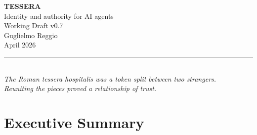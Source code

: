 \documentclass[11pt, a4paper]{article}
\begin{document}
\thispagestyle{empty}
\vspace*{3.5cm}

\begin{center}
  {\Huge\bfseries TESSERA}\\[0.8em]
  {\Large Identity and authority for AI agents}\\[2.5em]
  {\large Working Draft v0.7}\\[1.2em]
  {\large Guglielmo Reggio}\\[0.6em]
  {\normalsize April 2026}\\[4em]
  \rule{8cm}{0.4pt}\\[1.5em]
  {\itshape\small
    The Roman \emph{tessera hospitalis} was a token split between two strangers.\\
    Reuniting the pieces proved a relationship of trust.
  }
\end{center}

\newpage
\setcounter{page}{1}
\tableofcontents
\newpage

\begin{abstract}
\noindent AI agents can now execute shell commands, modify files, send messages, call APIs, and trigger real-world side effects. The main security problem is no longer model output quality alone. It is ambient authority: agents routinely inherit broad, implicit permissions that are hard to scope, hard to revoke, and difficult to audit.

Tessera is a capability-based security layer for agent actions. At the product layer, Tessera provides identity and authority for AI agents. At the technical layer, it issues scoped capabilities, enforces them at runtime, revokes them quickly, and records decision traces for operators and platforms.

Tessera starts with a narrow wedge: runtime-native enforcement inside real agent runtimes such as OpenClaw. The goal is not to solve every aspect of AI safety or semantic policy. The goal is to make sensitive agent actions require explicit, revocable, runtime-enforced authority.

The long-term opportunity is larger. If platforms, runtimes, and operators adopt common authority checks, agents can become easier to trust, easier to constrain, and easier to audit. But that future depends on practical adoption, not protocol elegance. Tessera therefore starts with the most concrete problem first: capability-based security for agent actions.
\end{abstract}

\section{Executive Summary}
\end{document}
